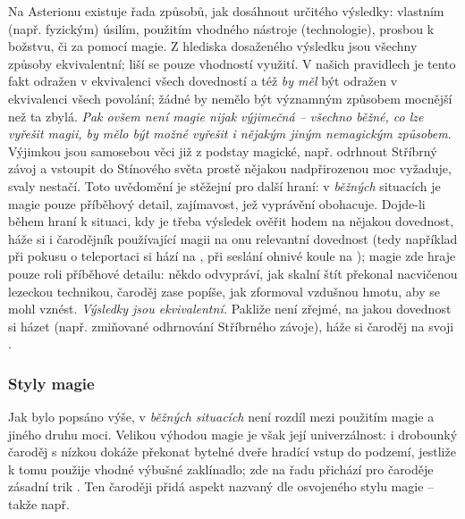 \documentclass[../main.tex]{subfiles}
\begin{document}
Na Asterionu existuje řada způsobů, jak dosáhnout určitého výsledky: vlastním (např. fyzickým) úsilím, použitím vhodného nástroje (technologie), prosbou k božstvu, či za pomocí magie. Z hlediska dosaženého výsledku jsou všechny způsoby ekvivalentní; liší se pouze vhodností využití. V našich pravidlech je tento fakt odražen v ekvivalenci všech dovedností a též \emph{by měl} být odražen v ekvivalenci všech povolání; žádné by nemělo být významným způsobem mocnější než ta zbylá.  \emph{Pak ovšem není magie nijak výjimečná – všechno \emph{běžné}, co lze vyřešit magii, by mělo být možné vyřešit i \emph{nějakým jiným nemagickým způsobem}}. Výjimkou jsou samosebou věci již z podstay magické, např. odrhnout Stříbrný závoj a vstoupit do Stínového světa prostě nějakou nadpřirozenou moc vyžaduje, svaly nestačí. Toto uvědomění je stěžejní pro další hraní: v \emph{běžných} situacích je magie pouze příběhový detail, zajímavost, jež vyprávění obohacuje.
Dojde-li během hraní k situaci, kdy je třeba výsledek ověřit hodem na nějakou dovednost, háže si i čarodějník používající magii na onu relevantní dovednost (tedy například při pokusu o teleportaci si hází na , při seslání ohnivé koule na ); magie zde hraje pouze roli příběhové detailu: někdo odvypráví, jak skalní štít překonal nacvičenou lezeckou technikou, čaroděj zase popíše, jak zformoval vzdušnou hmotu, aby se mohl vznést.  \emph{Výsledky jsou ekvivalentní.} Pakliže není zřejmé, na jakou dovednost si házet (např. zmiňované odhrnování Stříbrného závoje), háže si čaroděj na svoji .

\subsubsection*{Styly magie}
\label{sec:stylymagie}

Jak bylo popsáno výše, v \emph{běžných situacích} není rozdíl mezi použitím magie a jiného druhu moci. Velikou výhodou magie je však její univerzálnost: i drobounký čaroděj s nízkou  dokáže překonat bytelné dveře hradící vstup do podzemí, jestliže k tomu použije vhodné výbušné zaklínadlo; zde na řadu přichází pro čaroděje zásadní trik . Ten čaroději přidá aspekt nazvaný dle osvojeného stylu magie – takže např. 
\end{document}
